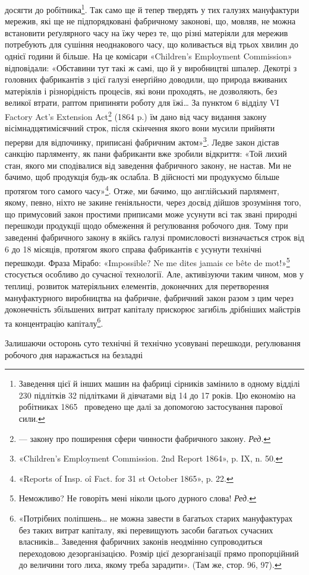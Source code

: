 \parcont{}  %
досягти до робітника\footnote{
Заведення цієї й інших машин на фабриці сірників замінило в
одному відділі  230 підлітків 32 підлітками й дівчатами від 14 до 17 років.
Цю економію на робітниках 1865~ проведено ще далі за допомогою застосування
парової сили.
}. Так само ще й тепер твердять у тих
галузях мануфактури мережив, які ще не підпорядковані фабричному
законові, що, мовляв, не можна встановити реґулярного
часу на їжу через те, що різні матеріяли для мережив потребують
для сушіння неоднакового часу, що коливається від трьох хвилин
до однієї години й більше. На це комісари «Children’s Employment
Commission» відповідали: «Обставини тут такі ж самі, що
й у виробництві шпалер. Декотрі з головних фабрикантів з цієї
галузі енерґійно доводили, що природа вживаних матеріялів і
різнорідність процесів, які вони проходять, не дозволяють, без великої
втрати, раптом припиняти роботу для їжі\dots{} За пунктом 6
відділу VI Factory Act’s Extension Act\footnote*{
— закону про поширення сфери чинности фабричного закону. \emph{Ред.}
} (1864 p.) їм дано від
часу видання закону вісімнадцятимісячний строк, після скінчення
якого вони мусили прийняти перерви для відпочинку,
приписані фабричним актом»\footnote{
«Children’s Employment Commission. 2nd Report 1864», p. IX,
n. 50.
}. Ледве закон дістав санкцію
парляменту, як пани фабриканти вже зробили відкриття: «Той
лихий стан, якого ми сподівалися від заведення фабричного закону,
не настав. Ми не бачимо, щоб продукція будь-як ослабла.
В дійсності ми продукуємо більше протягом того самого часу»\footnote{
«Reports of Insp. oî Fact. for 31 st October 1865», p. 22.
}.
Отже, ми бачимо, що англійський парлямент, якому, певно,
ніхто не закине геніяльности, через досвід дійшов зрозуміння
того, що примусовий закон простими приписами може усунути
всі так звані природні перешкоди продукції щодо обмеження
й реґулювання робочого дня. Тому при заведенні фабричного
закону в якійсь галузі промисловості визначається строк від 6
до 18 місяців, протягом якого справа фабрикантів є усунути
технічні перешкоди. Фраза Мірабо: «Impossible? Ne me dites
jamais ce bête de mot!»\footnote*{
Неможливо? Не говоріть мені ніколи цього дурного слова! \emph{Ред.}
} стосується особливо до сучасної технології.
Але, активізуючи таким чином, мов у теплиці, розвиток
матеріяльних елементів, доконечних для перетворення мануфактурного
виробництва на фабричне, фабричний закон разом з
цим через доконечність збільшених витрат капіталу прискорює
загибіль дрібніших майстрів та концентрацію капіталу\footnote{
«Потрібних поліпшень\dots{} не можна завести в багатьох старих
мануфактурах без таких витрат капіталу, які перевищують засоби багатьох
сучасних власників\dots{} Заведення фабричних законів неодмінно
супроводиться переходовою дезорганізацією. Розмір цієї дезорганізації
прямо пропорційний до величини того лиха, якому треба зарадити».
(Там же, стор. 96, 97).
}.

Залишаючи осторонь суто технічні й технічно усовувані
перешкоди, реґулювання робочого дня наражається на безладні
\parbreak{}  %
